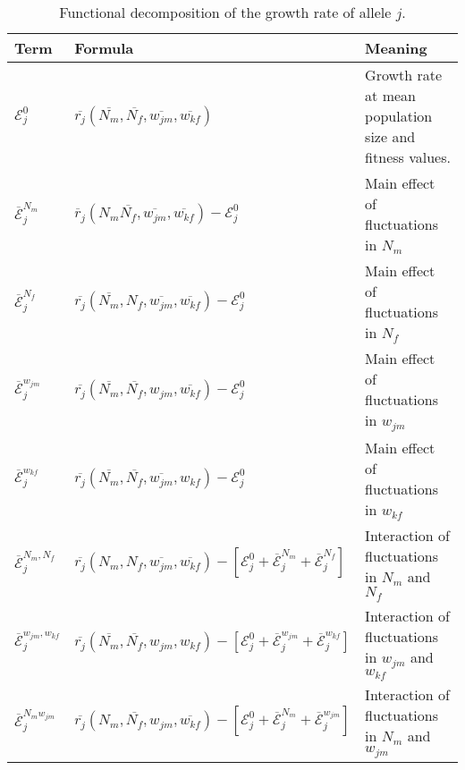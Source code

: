 \documentclass[12pt]{article}
\begin{document}
\begin{table}[h]
\fontsize{7}{12}\selectfont %
    \centering
      \caption{Functional decomposition of the growth rate of allele $j$.  }
  \resizebox{\textwidth}{!} {\begin{tabular}{l|l|l}
  \toprule
        Term & Formula & Meaning \\
        \hline
         $\mathcal{E}^{0}_{j}$ & $\overline{r_{j}} (\overline{N_{m}}, \overline{N_{f}}, \overline{w_{jm}}, \overline{w_{kf}})$ & Growth rate at mean population size and fitness values. \\


         $\overline{\mathcal{E}}^{N_{m}}_{j}$ & $\overline{r}_{j}(N_{m} \overline{N_{f}}, \overline{w_{jm}}, \overline{w_{kf}}) - \mathcal{E}^{0}_{j} $ & Main effect of fluctuations in $N_{m}$\\

         $\overline{\mathcal{E}}^{N_{f}}_{j}$ & $ \overline{r_{j}}( \overline{N_{m}}, N_{f},\overline{w_{jm}}, \overline{w_{kf}}) - \mathcal{E}^{0}_{j}$ & Main effect of fluctuations in $N_{f}$ \\

        $\overline{\mathcal{E}}^{w_{jm}}_{j}$ & $ \overline{r_{j}}(\overline{N_{m}}, \overline{N_{f}}, w_{jm}, \overline{w_{kf}}) - \mathcal{E}^{0}_{j}$& Main effect of fluctuations in $w_{jm}$\\

        $\overline{\mathcal{E}}^{w_{kf}}_{j}$ & $ \overline{r_{j}}(\overline{N_{m}}, \overline{N_{f}}, \overline{w_{jm}}, w_{kf})- \mathcal{E}^{0}_{j}$ & Main effect of fluctuations in $w_{kf}$\\

        $\overline{\mathcal{E}}^{N_{m},N_{f}}_{j}$ & $ \overline{r_{j}}(N_{m}, N_{f}, \overline{w_{jm}}, \overline{w_{kf}})- [\mathcal{E}^{0}_{j} +\overline{\mathcal{E}}^{N_{m}}_{j}+\overline{\mathcal{E}}^{N_{f}}_{j}]$ & Interaction of fluctuations in $N_{m}$ and $N_{f}$\\

        $\overline{\mathcal{E}}^{w_{jm},w_{kf}}_{j}$ & $ \overline{r_{j}}(\overline{N_{m}}, \overline{N_{f}}, w_{jm}, w_{kf})- [\mathcal{E}^{0}_{j} +\overline{\mathcal{E}}^{w_{jm}}_j+\overline{\mathcal{E}}^{w_{kf}}_{j}]$ & Interaction of fluctuations in $w_{jm}$ and $w_{kf}$ \\

        $\overline{\mathcal{E}}^{N_{m}w_{jm}}_{j}$ & $\overline{r_{j}}(N_{m}, \overline{N_{f}}, w_{jm}, \overline{w_{kf}})- [\mathcal{E}^{0}_{j} +\overline{\mathcal{E}}^{N_{m}}_j+\overline{\mathcal{E}}^{w_{jm}}_{j}]$  & Interaction of fluctuations in $N_{m}$ and $w_{jm}$ \\



\end{tabular}}
\end{table}
\end{document}
